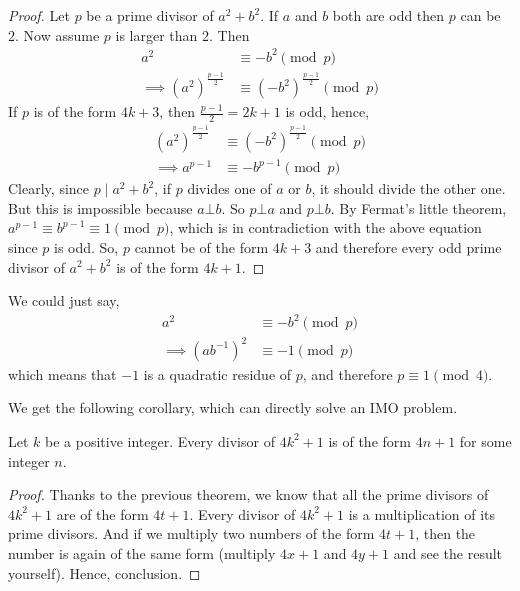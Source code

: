 \documentclass[main.tex]{subfile}
\begin{document}
	\begin{proof}
		Let $p$ be a prime divisor of $a^2+b^2$. If $a$ and $b$ both are odd then $p$ can be $2$. Now assume $p$ is larger than $2$. Then
			\begin{align*}
				a^2
					& \equiv-b^2 \pmod p\\
				\implies \left(a^2\right)^{\frac{p-1}{2}}
					& \equiv \left(-b^2\right)^{\frac{p-1}{2}}\pmod p
			\end{align*}
		If $p$ is of the form $4k+3$, then $\frac{p-1}{2}=2k+1$ is odd, hence,
			\begin{align*}
			\left(a^2\right)^{\frac{p-1}{2}}
				& \equiv \left(-b^2\right)^{\frac{p-1}{2}}\pmod p\\
			\implies a^{p-1}
				& \equiv -b^{p-1} \pmod p
			\end{align*}
		Clearly, since $p\mid a^2+b^2$, if $p$ divides one of $a$ or $b$, it should divide the other one. But this is impossible because $a \bot b$. So $p \bot a$ and $p \bot b$. By Fermat's little theorem, $a^{p-1} \equiv b^{p-1} \equiv 1 \pmod p$, which is in contradiction with the above equation since $p$ is odd.
		So, $p$ cannot be of the form $4k+3$ and therefore every odd prime divisor of $a^2+b^2$ is of the form $4k+1$.
	\end{proof}

	\begin{note}
	We could just say,
			\begin{align*}
				a^2
					& \equiv-b^2\pmod p\\
				\implies (ab^{-1})^2
					& \equiv-1\pmod p
			\end{align*}
		which means that $-1$ is a quadratic residue of $p$, and therefore $p\equiv1\pmod4$.
	\end{note}
We get the following corollary, which can directly solve an IMO problem.
	\begin{corollary}\label{cor:4n+1}
		Let $k$ be a positive integer. Every divisor of $4k^2+1$ is of the form $4n+1$ for some integer $n$.
	\end{corollary}

	\begin{proof}
		Thanks to the previous theorem, we know that all the prime divisors of $4k^2+1$ are of the form $4t+1$. Every divisor of $4k^2+1$ is a multiplication of its prime divisors. And if we multiply two numbers of the form $4t+1$, then the number is again of the same form (multiply $4x+1$ and $4y+1$ and see the result yourself). Hence, conclusion.
	\end{proof}
\end{document}
